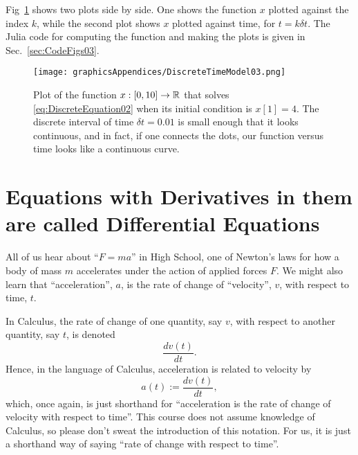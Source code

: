 Fig~\ref{fig:Proj03Plot03} shows two plots side by side. One shows the function $x$ plotted against the index $k$, while the second plot shows $x$ plotted against time, for $t=k \delta t$. The Julia code for computing the function and making the plots is given in Sec.~\ref{sec:CodeFigs03}.\\

\begin{figure}[t!]
\centering
\texttt{[image: graphicsAppendices/DiscreteTimeModel03.png]}
\caption[]{Plot of the function $x:[0,10]\to \mathbb R$ that solves \eqref{eq:DiscreteEquation02} when its initial condition is $x[1]=4$. The discrete interval of time $\delta t = 0.01$ is small enough that it looks continuous, and in fact, if one connects the dots, our function versus time looks like a continuous curve.}
\label{fig:Proj03Plot03}
\end{figure}

\section{Equations with Derivatives in them are called Differential Equations}
\label{sec:ODEs4Real}
All of us hear about ``$F=ma$'' in High School, one of Newton's laws for how a body of mass $m$ accelerates under the action of applied forces $F$. We might also learn that ``acceleration'', $a$, is the rate of change of ``velocity'', $v$, with respect to time, $t$. 

\vspace*{0.5cm}
\begin{tcolorbox}[sharp corners, colback=green!30, colframe=green!80!blue, title=\textbf{\large The notation $\mathbf{\frac{d}{dt}}$}]
In Calculus, the rate of change of one quantity, say $v$, with respect to another quantity, say $t$, is denoted 
$$ \frac{dv(t)}{dt}.$$
Hence, in the language of Calculus, acceleration is related to velocity by
$$a(t) := \frac{dv(t)}{dt}, $$
which, once again, is just shorthand for ``acceleration is the rate of change of velocity with respect to time''. This course does not assume knowledge of Calculus, so please don't sweat the introduction of this notation. For us, it is just a shorthand way of saying ``rate of change with respect to time''.
\end{tcolorbox}

